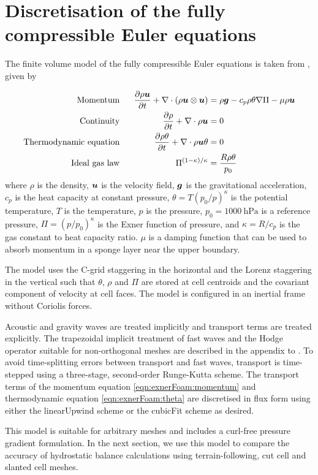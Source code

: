 \section{Discretisation of the fully compressible Euler equations}
\label{sec:slanted:exnerFoamH}

The finite volume model of the fully compressible Euler equations is taken from \citet{weller-shahrokhi2014}, given by

\begin{subequations}
\begin{align}
	\text{Momentum} &\ &\  	\frac{\partial \rho \vect{u}}{\partial t} + \nabla \cdot \left( \rho \vect{u}\otimes\vect{u} \right) &= \rho \vect{g} - c_p \rho \theta \nabla \Pi - \mu \rho \vect{u} \label{eqn:exnerFoam:momentum} \\
	\text{Continuity} &\ &\	\frac{\partial \rho}{\partial t} + \nabla \cdot \rho \vect{u} &= 0 \label{eqn:exnerFoam:cont} \\
	\text{Thermodynamic equation} &\ &\ \frac{\partial \rho \theta}{\partial t} + \nabla \cdot \rho \vect{u} \theta &= 0 \label{eqn:exnerFoam:theta} \\
	\text{Ideal gas law} &\ &\ \Pi^{(1 - \kappa)/\kappa} &= \frac{R \rho \theta}{p_0} \label{eqn:exnerFoam:state}
\end{align}%
\end{subequations}
where \(\rho\) is the density, \(\bm{u}\) is the velocity field, \(\bm{g}\) is the gravitational acceleration, \(c_p\) is the heat capacity at constant pressure, \(\theta = T \left(p_0/p\right)^\kappa\) is the potential temperature, \(T\) is the temperature, \(p\) is the pressure, \(p_0 = \SI{1000}{\hecto\pascal}\) is a reference pressure, \(\Pi = \left(p / p_0 \right)^\kappa\) is the Exner function of pressure, and \(\kappa = R/c_p\) is the gas constant to heat capacity ratio.  \(\mu\) is a damping function that can be used to absorb momentum in a sponge layer near the upper boundary.

The model uses the C-grid staggering in the horizontal and the Lorenz staggering in the vertical such that $\theta$, $\rho$ and $\Pi$ are stored at cell centroids and the covariant component of velocity at cell faces.  The model is configured in an inertial frame without Coriolis forces.

Acoustic and gravity waves are treated implicitly and transport terms are treated explicitly.
The trapezoidal implicit treatment of fast waves and the Hodge operator suitable for non-orthogonal meshes are described in the appendix to \citet{shaw-weller2016}.
To avoid time-splitting errors between transport and fast waves, transport is time-stepped using a three-stage, second-order Runge-Kutta scheme.
The transport terms of the momentum equation \eqref{eqn:exnerFoam:momentum} and thermodynamic equation \eqref{eqn:exnerFoam:theta} are discretised in flux form using either the linearUpwind scheme or the cubicFit scheme as desired.

This model is suitable for arbitrary meshes and includes a curl-free pressure gradient formulation.
In the next section, we use this model to compare the accuracy of hydrostatic balance calculations using terrain-following, cut cell and slanted cell meshes.
